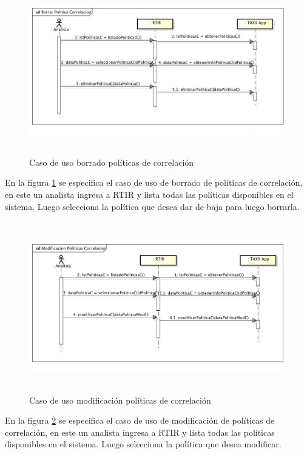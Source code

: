 \bigskip
\begin{figure}[ht!]
	\includegraphics[width=5.7634in,height=2.898in]{Analisis22-img/Analisis22-img020.png}
	\caption{Caso de uso borrado políticas de correlación} 
	\label{fig.borradocorrelacion}
\end{figure}
{
	En la figura \ref{fig.borradocorrelacion} se especifica el caso de uso de borrado de políticas de correlación, en este un analista ingresa a RTIR y
	lista todas las políticas disponibles en el sistema. Luego selecciona la política que desea dar de baja para luego
	borrarla.}


\bigskip


\bigskip
\begin{figure}[ht!]
	\centering
	\includegraphics[width=5.7638in,height=2.9256in]{Analisis22-img/Analisis22-img021.png} 
	\caption{Caso de uso modificación políticas de correlación}
	\label{fig.modificacioncorrelacion}
\end{figure}
{
	En la figura \ref{fig.modificacioncorrelacion} se especifica el caso de uso de modificación de políticas de correlación, en este un analista ingresa a
	RTIR y lista todas las políticas disponibles en el sistema. Luego selecciona la política que desea modificar.}


